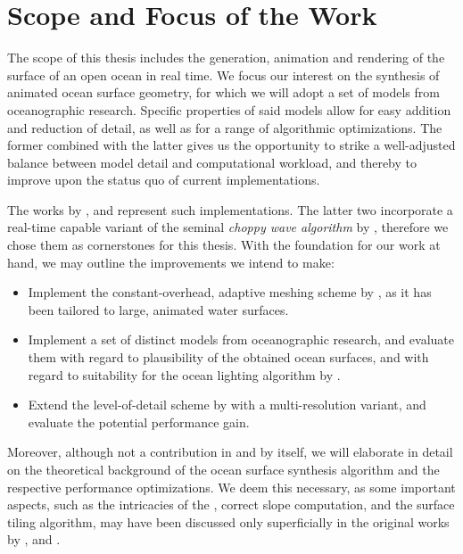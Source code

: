 \section{Scope and Focus of the Work}
\label{sec:scope_and_focus}
The scope of this thesis includes the generation, animation and rendering of the
surface of an open ocean in real time. We focus our interest on the synthesis of
animated ocean surface geometry, for which we will adopt a set of models from
oceanographic research. Specific properties of said models allow for
easy addition and reduction of detail, as well as for a range of algorithmic
optimizations. The former combined with the latter gives us the opportunity to
strike a well-adjusted balance between model detail and computational workload,
and thereby to improve upon the status quo of current implementations.
\textcolor{changed}{
The works by \citet{article:oceanlighting,misc:oceanlightingfft}, and
\citet{article:whitecaps} represent such implementations.
The latter two incorporate a real-time capable variant of the seminal
\emph{choppy wave algorithm} by \citet{course:simulatingocean}, therefore
we chose them as cornerstones for this thesis. With the foundation for
our work at hand, we may outline the improvements we intend to make:
\begin{itemize}
	\item Implement the constant-overhead, adaptive meshing scheme
	by \citet{thesis:johanson}, as it has been tailored to large,
	animated water surfaces.
	\item Implement a set of distinct models from oceanographic
	research, and evaluate them with regard to plausibility
	of the obtained ocean surfaces, and with regard to suitability
	for the	ocean lighting algorithm by \citet{article:oceanlighting}.
	\item Extend the level-of-detail scheme by
	\citet{misc:oceanlightingfft} with a multi-resolution variant,
	and evaluate the potential performance gain.
\end{itemize}
%
Moreover, although not a contribution in and by itself, we will elaborate
in detail on the theoretical background of the ocean surface synthesis
algorithm and the respective performance optimizations. We deem this
necessary, as some important aspects, such as the intricacies of the
\FourierTransform, correct slope computation, and the surface tiling
algorithm, may have been discussed only superficially in the original
works by
\citet{course:simulatingocean,article:oceanlighting,misc:oceanlightingfft},
and \citet{article:whitecaps}.
}
